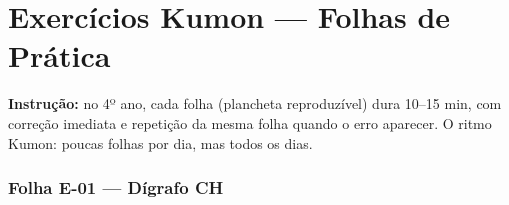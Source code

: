 
\chapter{Exercícios Kumon --- Folhas de Prática}

\textbf{Instrução:} no 4º ano, cada folha (plancheta reproduzível) dura 10–15 min, com correção imediata e repetição da mesma folha quando o erro aparecer. O ritmo Kumon: poucas folhas por dia, mas todos os dias.



\subsection{Folha E-01 --- Dígrafo CH}
